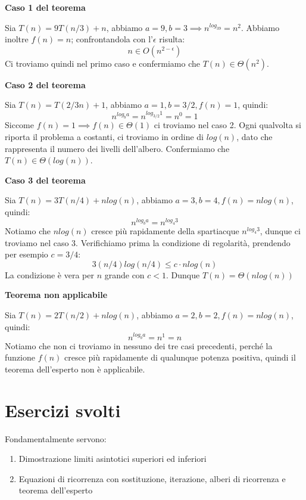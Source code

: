 \begin{esempio}
	\textbf{Caso 1 del teorema}\par
	\noindent Sia $T(n) = 9T(n/3) + n$, abbiamo $a = 9, b = 3 \implies n^{log_39} = n^2$. Abbiamo inoltre $f(n) = n$; confrontandola con l'$\epsilon$ risulta: \[n \in O(n^{2-\epsilon})\]
	\noindent Ci troviamo quindi nel primo caso e confermiamo che $T(n) \in \Theta(n^2)$.
\end{esempio}
\begin{esempio}
	\textbf{Caso 2 del teorema}\par 
	\noindent Sia $T(n) = T(2/3n) + 1$, abbiamo $a = 1, b = 3/2, f(n) = 1$, quindi: \[n^{log_b a} = n^{log_{3/2} 1} = n^0 = 1\]
	\noindent Siccome $f(n) = 1 \implies f(n) \in \Theta(1)$ ci troviamo nel caso 2. Ogni qualvolta si riporta il problema a costanti, ci troviamo in ordine di $log(n)$, dato che rappresenta il numero dei livelli dell'albero. Confermiamo che $T(n) \in \Theta(log(n))$.
\end{esempio}
\begin{esempio}
	\textbf{Caso 3 del teorema}\par
	\noindent Sia $T(n) = 3T(n/4) + nlog(n)$, abbiamo $a = 3, b = 4, f(n) = nlog(n)$, quindi: \[n^{log_b a} = n^{log_4 3}\]
	\noindent Notiamo che $nlog(n)$ cresce più rapidamente della spartiacque $n^{log_4 3}$, dunque ci troviamo nel caso $3$. Verifichiamo prima la condizione di regolarità, prendendo per esempio $c=3/4$: \[3(n/4)log(n/4) \leq c\cdot nlog(n)\]
	\noindent La condizione è vera per $n$ grande con $c<1$. Dunque $T(n) = \Theta(nlog(n))$
\end{esempio}
\begin{esempio}
	\textbf{Teorema non applicabile}\par
	\noindent Sia $T(n) = 2T(n/2) + nlog(n)$, abbiamo $a = 2, b = 2, f(n) = nlog(n)$, quindi: \[n^{log_b a} = n^1 = n\]
	\noindent Notiamo che non ci troviamo in nessuno dei tre casi precedenti, perché la funzione $f(n)$ cresce più rapidamente di qualunque potenza positiva, quindi il teorema dell'esperto non è applicabile.
\end{esempio}

%

\section{Esercizi svolti}
Fondamentalmente servono: \begin{enumerate}
	\item Dimostrazione limiti asintotici superiori ed inferiori
	\item Equazioni di ricorrenza con sostituzione, iterazione, alberi di ricorrenza e teorema dell'esperto
\end{enumerate}

